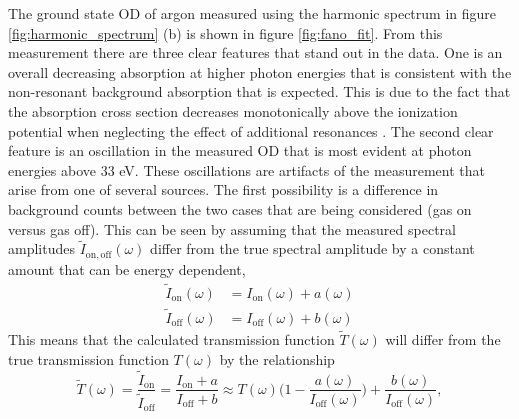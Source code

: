 The ground state OD of argon measured using the harmonic spectrum in figure \ref{fig:harmonic_spectrum} (b) is shown in figure \ref{fig:fano_fit}.  From this measurement there are three clear features that stand out in the data.  One is an overall decreasing absorption at higher photon energies that is consistent with the non-resonant background absorption that is expected.  This is due to the fact that the absorption cross section decreases monotonically above the ionization potential when neglecting the effect of additional resonances \cite{henkeXRayInteractionsPhotoabsorption1993, sorensenArgon3sAutoionization1994, ogurtsovAutoIonizationStatesArgon1970}.  The second clear feature is an oscillation in the measured OD that is most evident at photon energies above 33 eV.  These oscillations are artifacts of the measurement that arise from one of several sources.  The first possibility is a difference in background counts between the two cases that are being considered (gas on versus gas off).  This can be seen by assuming that the measured spectral amplitudes $\tilde{I}_{\mathrm{on,off}}(\omega)$ differ from the true spectral amplitude by a constant amount that can be energy dependent,
\begin{equation}
\label{eqn:measured_approx}
	\begin{aligned}
	\tilde{I}_{\mathrm{on}}(\omega) &= I_{\mathrm{on}}(\omega) + a(\omega) \\
	\tilde{I}_{\mathrm{off}}(\omega) &= I_{\mathrm{off}}(\omega) + b(\omega)
	\end{aligned}
\end{equation}
This means that the calculated transmission function $\tilde{T}(\omega)$ will differ from the true transmission function $T(\omega)$ by the relationship
\begin{equation}
	\tilde{T}(\omega) = \frac{\tilde{I}_{\mathrm{on}}}{\tilde{I}_{\mathrm{off}}} = \frac{I_{\mathrm{on}} + a}{I_{\mathrm{off}} + b} \approx T(\omega)\bigg(1 - \frac{a(\omega)}{I_{\mathrm{off}}(\omega)}\bigg) + \frac{b(\omega)}{I_{\mathrm{off}}(\omega)},
\end{equation}
